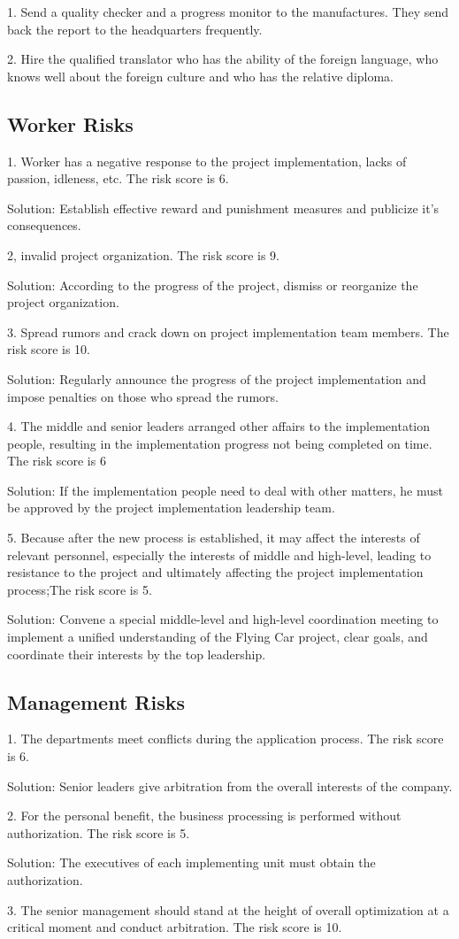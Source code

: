 1. Send a quality checker and a progress monitor to the manufactures. They send back the report to the headquarters frequently.

2. Hire the qualified translator who has the ability of the foreign language, who knows well about the foreign culture and who has the relative diploma.

\subsection{Worker Risks}

1. Worker has a negative response to the project implementation, lacks of passion, idleness, etc. The risk score is 6.

Solution: Establish effective reward and punishment measures and publicize it’s consequences.

2, invalid project organization. The risk score is 9.

Solution: According to the progress of the project, dismiss or reorganize the project organization.

3. Spread rumors and crack down on project implementation team members. The risk score is 10.

Solution: Regularly announce the progress of the project implementation and impose penalties on those who spread the rumors.

4. The middle and senior leaders arranged other affairs to the implementation people, resulting in the implementation progress not being completed on time. The risk score is 6

Solution: If the implementation people need to deal with other matters, he must be approved by the project implementation leadership team.

5. Because after the new process is established, it may affect the interests of relevant personnel, especially the interests of middle and high-level, leading to resistance to the project and ultimately affecting the project implementation process;The risk score is 5.

Solution: Convene a special middle-level and high-level coordination meeting to implement a unified understanding of the Flying Car project, clear goals, and coordinate their interests by the top leadership.

\subsection{Management Risks}

1. The departments meet conflicts during the application process. The risk score is 6.

Solution: Senior leaders give arbitration from the overall interests of the company.

2. For the personal benefit, the business processing is performed without authorization. The risk score is 5.

Solution: The executives of each implementing unit must obtain the authorization.

3. The senior management should stand at the height of overall optimization at a critical moment and conduct arbitration. The risk score is 10.

{\color{red}{矩阵}}